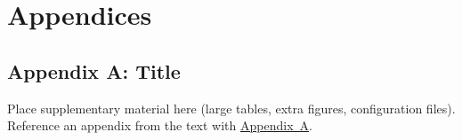 \chapter*{Appendices}
{}
\thispagestyle{plain}

\setcounter{figure}{0}
\setcounter{table}{0}
\setcounter{lstlisting}{0}
\renewcommand{\thefigure}{A.\arabic{figure}}
\renewcommand{\thetable}{A.\arabic{table}}
\renewcommand{\thelstlisting}{A.\arabic{lstlisting}}

\section*{Appendix A: Title}
\label{app:a}

Place supplementary material here (large tables, extra figures, configuration
files). Reference an appendix from the text with \hyperref[app:a]{Appendix~A}.

\newpage

